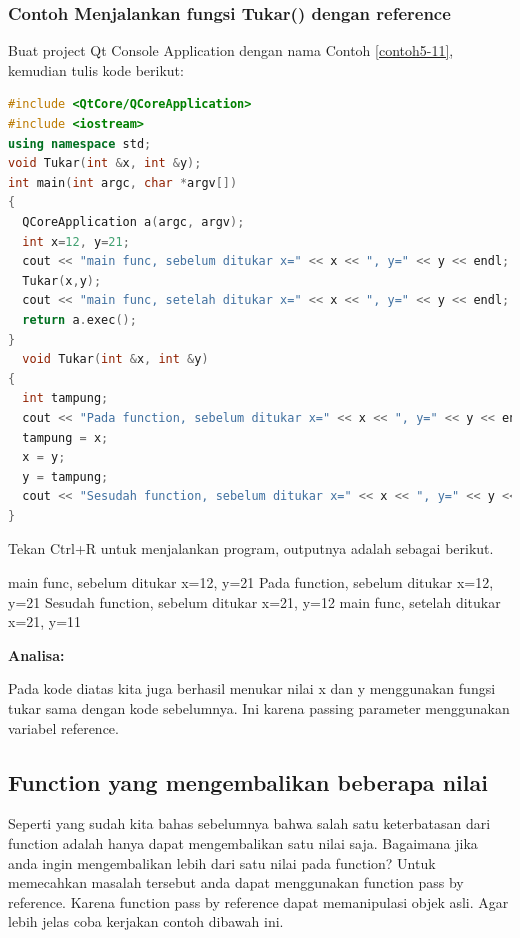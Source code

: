 \subsubsection*{Contoh  Menjalankan fungsi Tukar() dengan reference}

Buat project Qt Console Application dengan nama Contoh \ref{contoh5-11}, kemudian
tulis kode berikut:

\begin{lstlisting}[language=c++, caption=Menjalankan fungsi Tukar() dengan reference, label=contoh5-11]
#include <QtCore/QCoreApplication>
#include <iostream>
using namespace std;
void Tukar(int &x, int &y);
int main(int argc, char *argv[])
{
  QCoreApplication a(argc, argv);
  int x=12, y=21;
  cout << "main func, sebelum ditukar x=" << x << ", y=" << y << endl;
  Tukar(x,y);
  cout << "main func, setelah ditukar x=" << x << ", y=" << y << endl;
  return a.exec();
}
  void Tukar(int &x, int &y)
{
  int tampung;
  cout << "Pada function, sebelum ditukar x=" << x << ", y=" << y << endl;
  tampung = x;
  x = y;
  y = tampung;
  cout << "Sesudah function, sebelum ditukar x=" << x << ", y=" << y << endl;
}
\end{lstlisting}

Tekan Ctrl+R untuk menjalankan program, outputnya adalah sebagai
berikut.

\begin{lcverbatim}
main func, sebelum ditukar x=12, y=21
Pada function, sebelum ditukar x=12, y=21
Sesudah function, sebelum ditukar x=21, y=12
main func, setelah ditukar x=21, y=11
\end{lcverbatim}

\textbf{Analisa:}

Pada kode diatas kita juga berhasil menukar nilai x dan y menggunakan
fungsi tukar sama dengan kode sebelumnya. Ini karena passing parameter
menggunakan variabel reference.

\subsection{Function yang mengembalikan beberapa
nilai}\label{function-yang-mengembalikan-beberapa-nilai}

Seperti yang sudah kita bahas sebelumnya bahwa salah satu keterbatasan
dari function adalah hanya dapat mengembalikan satu nilai saja.
Bagaimana jika anda ingin mengembalikan lebih dari satu nilai pada
function? Untuk memecahkan masalah tersebut anda dapat menggunakan
function pass by reference. Karena function pass by reference dapat
memanipulasi objek asli. Agar lebih jelas coba kerjakan contoh dibawah
ini.

